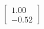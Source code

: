 \documentclass[preview]{standalone}
\begin{document}
\begin{align*}
\begin{bmatrix} 1.00 \\ -0.52 \end{bmatrix}
\end{align*}
\end{document}
